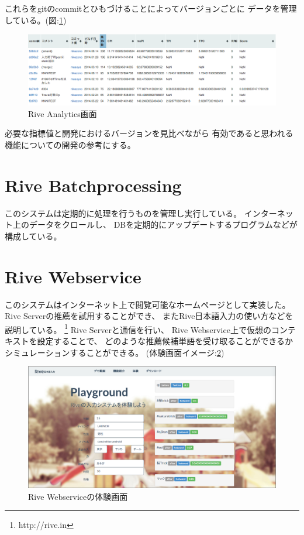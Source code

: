 これらをgitのcommitとひもづけることによってバージョンごとに
データを管理している。(図:\ref{fig:riveanalytics})
\begin{figure}[htbp]
  \begin{center}
    \includegraphics[width=170mm,bb=0 0 952 274]{images/riveanalytics.png}
    \caption{Rive Analytics画面}
    \label{fig:riveanalytics}
  \end{center}
\end{figure}
必要な指標値と開発におけるバージョンを見比べながら
有効であると思われる機能についての開発の参考にする。

\section{Rive Batchprocessing}
このシステムは定期的に処理を行うものを管理し実行している。
インターネット上のデータをクロールし、
DBを定期的にアップデートするプログラムなどが構成している。

\section{Rive Webservice}
このシステムはインターネット上で閲覧可能なホームページとして実装した。
Rive Serverの推薦を試用することができ、
またRive日本語入力の使い方などを説明している。
\footnote{http://rive.in}
Rive Serverと通信を行い、
Rive Webservice上で仮想のコンテキストを設定することで、
どのような推薦候補単語を受け取ることができるか
シミュレーションすることができる。
(体験画面イメージ:\ref{fig:rivewebservice})
\begin{figure}[htbp]
  \begin{center}
    \includegraphics[width=160mm,bb=0 0 1349 662]{images/rivewebservice.png}
    \caption{Rive Webserviceの体験画面}
    \label{fig:rivewebservice}
  \end{center}
\end{figure}

